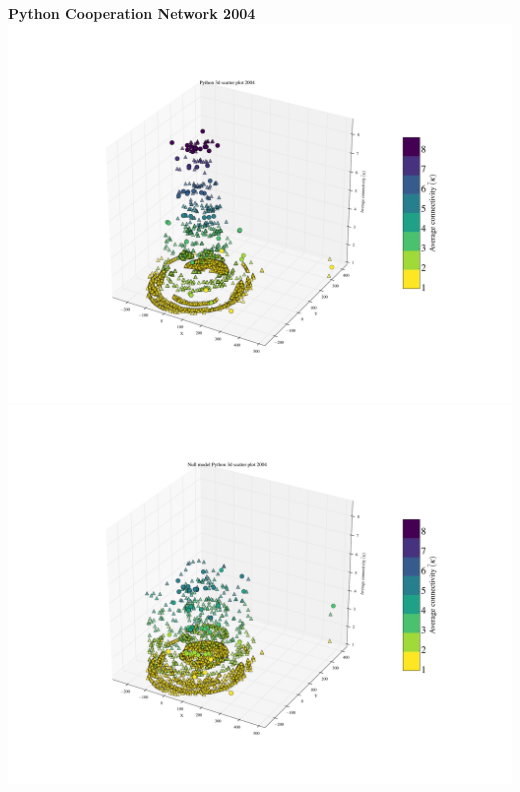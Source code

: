 \documentclass[ignorenonframetext,red,8pt,notes=hide]{beamer}
\begin{document}
\begin{frame}
\begin{columns}[c]
\begin{column}{0.5\textwidth}
\begin{center}
\textbf{Python Cooperation Network 2004}
\includegraphics[scale=0.12]{../../figures/3d_scatter_python_2004}
\newline
\includegraphics[scale=0.12]{../../figures/3d_scatter_python_2004_null}
\end{center}
\end{column}
\end{columns}

\end{frame}
\end{document}
